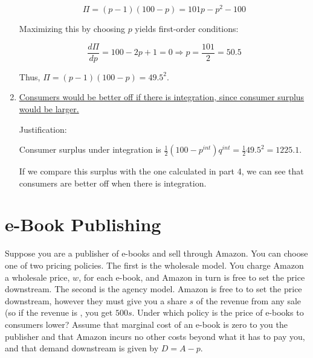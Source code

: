 \documentclass{article}
\newenvironment{solution}{\color{red}}{\color{black}}
\begin{document}
\begin{solution}
\begin{enumerate}
\[ \Pi=(p-1)(100-p)=101p-p^2-100 \]

Maximizing this by choosing $p$ yields first-order conditions:

\[ \frac{d \Pi}{d p}=100-2p+1=0 \Rightarrow p=\frac{101}2=50.5 \]

Thus, $\Pi=(p-1)(100-p)=49.5^2$.

\item\underline{Consumers would be better off if there is integration, since consumer surplus would be larger.}

Justification:

Consumer surplus under integration is $\frac{1}{2}(100-p^{int})q^{int}=\frac{1}{2}49.5^2=1225.1$.

If we compare this surplus with the one calculated in part 4, we can see that consumers are better off when there is integration. 
\end{enumerate}

\end{solution}

\section*{e-Book Publishing}
Suppose you are a publisher of e-books and sell through Amazon. You can choose one of two pricing policies. The first is the wholesale model. You charge Amazon a wholesale price, $w$, for each e-book, and Amazon in turn is free to set the price downstream. The second is the agency model. Amazon is free to to set the price downstream, however they must give you a share $s$ of the revenue from any sale (so if the revenue is , you get $500s$. Under which policy is the price of e-books to consumers lower? Assume that marginal cost of an e-book is zero to you the publisher and that Amazon incurs no other costs beyond what it has to pay you, and that demand downstream is given by $D = A - p$.
\end{document}
